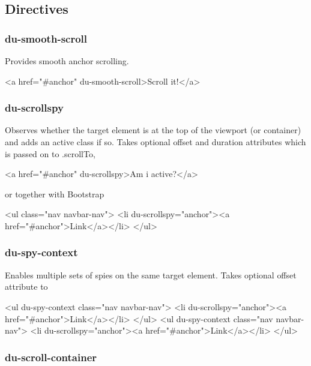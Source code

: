 \subsection*{Directives }

\subsubsection*{{\ttfamily du-\/smooth-\/scroll}}

Provides smooth anchor scrolling. 
\begin{DoxyCode}
<a href="#anchor" du-smooth-scroll>Scroll it!</a>
\end{DoxyCode}


\subsubsection*{{\ttfamily du-\/scrollspy}}

Observes whether the target element is at the top of the viewport (or container) and adds an {\ttfamily active} class if so. Takes optional {\ttfamily offset} and {\ttfamily duration} attributes which is passed on to {\ttfamily .scroll\+To},


\begin{DoxyCode}
<a href="#anchor" du-scrollspy>Am i active?</a>
\end{DoxyCode}


or together with Bootstrap


\begin{DoxyCode}
<ul class="nav navbar-nav">
  <li du-scrollspy="anchor"><a href="#anchor">Link</a></li>
</ul>
\end{DoxyCode}


\subsubsection*{{\ttfamily du-\/spy-\/context}}

Enables multiple sets of spies on the same target element. Takes optional {\ttfamily offset} attribute to


\begin{DoxyCode}
<ul du-spy-context class="nav navbar-nav">
  <li du-scrollspy="anchor"><a href="#anchor">Link</a></li>
</ul>
<ul du-spy-context class="nav navbar-nav">
  <li du-scrollspy="anchor"><a href="#anchor">Link</a></li>
</ul>
\end{DoxyCode}
 \subsubsection*{{\ttfamily du-\/scroll-\/container}}


